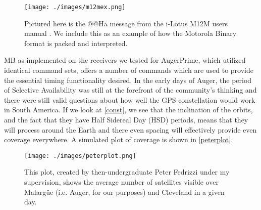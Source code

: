 \begin{figure}[h!]
\centering
\texttt{[image: ./images/m12mex.png]}
\caption[Example of a Motorola Binary Message]{Pictured here is the @@Ha message from the i-Lotus M12M users manual \cite{m12muser}. We include this as an example of how the Motorola Binary format is packed and interpreted.}
\label{m12mex}
\end{figure}

MB as implemented on the receivers we tested for AugerPrime, which utilized identical command sets, offers a number of commands which are used to provide the essential timing functionality desired. In the early days of Auger, the period of Selective Availability was still at the forefront of the community's thinking and there were still valid questions about how well the GPS constellation would work in South America. If we look at \autoref{const}, we see that the inclination of the orbits, and the fact that they have Half Sidereal Day (HSD) periods, means that they will process around the Earth and there even spacing will effectively provide even coverage everywhere. A simulated plot of coverage is shown in \autoref{peterplot}.

\begin{figure}[h!]
\centering
\texttt{[image: ./images/peterplot.png]}
\caption[Simulated GPS Coverage over Auger and Cleveland]{This plot, created by then-undergraduate Peter Fedrizzi under my supervision, shows the average number of satellites visible over Malarg\"{u}e (i.e. Auger, for our purposes) and Cleveland in a given day.}
\label{peterplot}
\end{figure}
